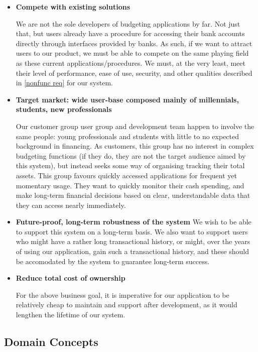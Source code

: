 \documentclass[11pt]{article}
\newcounter{use case ID}
\newcounter{req ID}
\begin{document}
\begin{itemize}
    \item \textbf{Compete with existing solutions}

    We are not the sole developers of budgeting applications by far. Not just that, but users already have a procedure for accessing their bank accounts directly through interfaces provided by banks. As such, if we want to attract users to our product, we must be able to compete on the same playing field as these current applications/procedures. We must, at the very least, meet their level of performance, ease of use, security, and other qualities described in \ref{nonfunc req} for our system.

    \item \textbf{Target market: wide user-base composed mainly of millennials, students, new professionals}

    Our customer group user group and development team happen to involve the same people: young professionals and students with little to no expected background in financing. As customers, this group has no interest in complex budgeting functions (if they do, they are not the target audience aimed by this system), but instead seeks some way of organising tracking their total assets. This group favours quickly accessed applications for frequent yet momentary usage. They want to quickly monitor their cash spending, and make long-term financial decisions based on clear, understandable data that they can access nearly immediately.

    \item \textbf{Future-proof, long-term robustness of the system} We wish to be able to support this system on a long-term basis. We also want to support users who might have a rather long transactional history, or might, over the years of using our application, gain such a transactional history, and these should be accomodated by the system to guarantee long-term success.

    \item \textbf{Reduce total cost of ownership}

    For the above business goal, it is imperative for our application to be relatively cheap to maintain and support after development, as it would lengthen the lifetime of our system.

\end{itemize}

\subsection{Domain Concepts}
\end{document}
